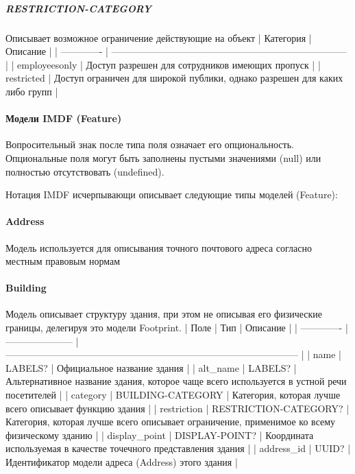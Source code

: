         \subparagraph{RESTRICTION-CATEGORY}
          Описывает возможное ограничение действующие на объект
          | Категория     | Описание                                                                   |
          | ------------- | -------------------------------------------------------------------------- |
          | employeesonly | Доступ разрешен для сотрудников имеющих пропуск                            |
          | restricted    | Доступ ограничен для широкой публики, однако разрешен для каких либо групп |

      \paragraph{Модели IMDF (Feature)}
        Вопросительный знак после типа поля означает его опциональность. Опциональные поля могут быть заполнены пустыми значениями (null) или полностью отсутствовать (undefined).

        Нотация IMDF исчерпывающи описывает следующие типы моделей (Feature):
      \paragraph{Address}
        Модель используется для описывания точного почтового адреса согласно местным правовым нормам

      \paragraph{Building}
        Модель описывает структуру здания, при этом не описывая его физические границы, делегируя это модели Footprint.
        | Поле          | Тип                   | Описание                                                                                     |
        | ------------- | --------------------- | -------------------------------------------------------------------------------------------- |
        | name          | LABELS?               | Официальное название здания                                                                  |
        | alt\_name      | LABELS?               | Альтернативное название здания, которое чаще всего используется в устной речи посетителей    |
        | category      | BUILDING-CATEGORY     | Категория, которая лучше всего описывает функцию здания                                      |
        | restriction   | RESTRICTION-CATEGORY? | Категория, которая лучше всего описывает ограничение, применимое ко всему физическому зданию |
        | display\_point | DISPLAY-POINT?        | Координата используемая в качестве точечного представления здания                            |
        | address\_id    | UUID?                 | Идентификатор модели адреса (Address) этого здания                                           |

